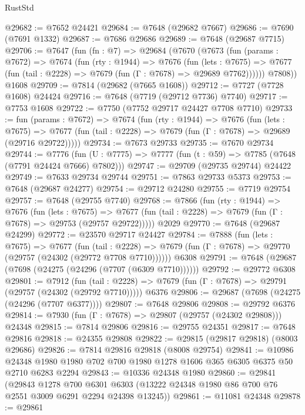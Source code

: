 \begin{lexlean}{RustStd}
\begin{coremodule}
@29682 := @7652 @24421
@29684 := @7648 (@29682 @7667)
@29686 := @7690 (@7691 @1332)
@29687 := @7686 @29686
@29689 := @7648 (@29687 @7715)
@29706 := @7647
    (fun (fn : @7) =>
    @29684
      (@7670
        (@7673
          (fun (params : @7672) =>
          @7674
            (fun (rty : @1944) =>
            @7676
              (fun (lets : @7675) =>
              @7677 (fun (tail : @2228) => @7679 (fun (Γ : @7678) => @29689 @7762))))))
        @7808))
    @1608
@29709 := @7814 (@29682 (@7665 @1608))
@29712 := @7727 (@7728 @1608) @24424
@29716 := @7648 (@7719 (@29712 @7736) @7740)
@29717 := @7753 @1608
@29722 := @7750 (@7752 @29717 @24427 @7708 @7710)
@29733 := fun (params : @7672) =>
  @7674
    (fun (rty : @1944) =>
    @7676
      (fun (lets : @7675) =>
      @7677 (fun (tail : @2228) => @7679 (fun (Γ : @7678) => @29689 (@29716 @29722)))))
@29734 := @7673 @29733
@29735 := @7670 @29734
@29744 := @7776
    (fun (U : @7775) => @7777 (fun (t : @59) => @7785 (@7648 (@7791 @24424 @7666) @7802)))
@29747 := @29709 (@29735 @29744) @24422
@29749 := @7633 @29734 @29744
@29751 := @7863 @29733 @5373
@29753 := @7648 (@29687 @24277)
@29754 := @29712 @24280
@29755 := @7719 @29754
@29757 := @7648 (@29755 @7740)
@29768 := @7866
    (fun (rty : @1944) =>
    @7676
      (fun (lets : @7675) =>
      @7677 (fun (tail : @2228) => @7679 (fun (Γ : @7678) => @29753 (@29757 @29722)))))
    @2029
@29770 := @7648 (@29687 @24299)
@29772 := @23570 @29717 @24427
@29784 := @7888
    (fun (lets : @7675) =>
    @7677
      (fun (tail : @2228) =>
      @7679 (fun (Γ : @7678) => @29770 (@29757 (@24302 (@29772 @7708 @7710))))))
    @6308
@29791 := @7648 (@29687 (@7698 (@24275 (@24296 (@7707 (@6309 @7710))))))
@29792 := @29772 @6308
@29801 := @7912
    (fun (tail : @2228) => @7679 (fun (Γ : @7678) => @29791 (@29757 (@24302 (@29792 @7710)))))
    @6376
@29806 := @29687 (@7698 (@24275 (@24296 (@7707 @6377))))
@29807 := @7648 @29806
@29808 := @29792 @6376
@29814 := @7930 (fun (Γ : @7678) => @29807 (@29757 (@24302 @29808))) @24348
@29815 := @7814 @29806
@29816 := @29755 @24351
@29817 := @7648 @29816
@29818 := @24355 @29808
@29822 := @29815 (@29817 @29818) (@8003 @29686)
@29826 := @7814 @29816 @29818 (@8008 @29754)
@29841 := @10986
    @24348
    @1980
    @1980
    @702
    @700
    @1980
    @1278
    @1606
    @365
    @6305
    @6375
    @50
    @2710
    @6283
    @2294
@29843 := @10336 @24348 @1980
@29860 := @29841
    (@29843
      @1278
      @700
      @6301
      @6303
      (@13222 @24348 @1980 @86 @700 @76 @2551 @3009 @6291 @2294 @24398 @13245))
@29861 := @11081 @24348
@29878 := @29861

\end{coremodule}
\end{lexlean}

